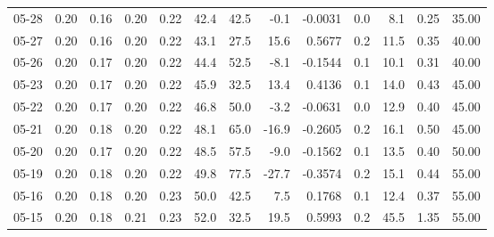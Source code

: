 \begin{threeparttable}
{\begin{tabular}{lrrrrrrrrrrrr}
  05-28 &          0.20 &          0.16 &          0.20 &        0.22 &                42.4 &                42.5 &       -0.1 &      -0.0031 &                 0.0 &              8.1 &            0.25 &                  35.00 \\
  05-27 &          0.20 &          0.16 &          0.20 &        0.22 &                43.1 &                27.5 &       15.6 &       0.5677 &                 0.2 &             11.5 &            0.35 &                  40.00 \\
  05-26 &          0.20 &          0.17 &          0.20 &        0.22 &                44.4 &                52.5 &       -8.1 &      -0.1544 &                 0.1 &             10.1 &            0.31 &                  40.00 \\
  05-23 &          0.20 &          0.17 &          0.20 &        0.22 &                45.9 &                32.5 &       13.4 &       0.4136 &                 0.1 &             14.0 &            0.43 &                  45.00 \\
  05-22 &          0.20 &          0.17 &          0.20 &        0.22 &                46.8 &                50.0 &       -3.2 &      -0.0631 &                 0.0 &             12.9 &            0.40 &                  45.00 \\
  05-21 &          0.20 &          0.18 &          0.20 &        0.22 &                48.1 &                65.0 &      -16.9 &      -0.2605 &                 0.2 &             16.1 &            0.50 &                  45.00 \\
  05-20 &          0.20 &          0.17 &          0.20 &        0.22 &                48.5 &                57.5 &       -9.0 &      -0.1562 &                 0.1 &             13.5 &            0.40 &                  50.00 \\
  05-19 &          0.20 &          0.18 &          0.20 &        0.22 &                49.8 &                77.5 &      -27.7 &      -0.3574 &                 0.2 &             15.1 &            0.44 &                  55.00 \\
  05-16 &          0.20 &          0.18 &          0.20 &        0.23 &                50.0 &                42.5 &        7.5 &       0.1768 &                 0.1 &             12.4 &            0.37 &                  55.00 \\
  05-15 &          0.20 &          0.18 &          0.21 &        0.23 &                52.0 &                32.5 &       19.5 &       0.5993 &                 0.2 &             45.5 &            1.35 &                  55.00 \\

\end{tabular}}
\end{threeparttable}
